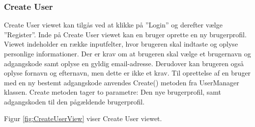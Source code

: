 \subsubsection{Create User}

Create User viewet kan tilgås ved at klikke på ''Login'' og derefter vælge ''Register''. Inde på Create User viewet kan en bruger oprette en ny brugerprofil. Viewet indeholder en række inputfelter, hvor brugeren skal indtaste og oplyse personlige informationer. Der er krav om at brugeren skal vælge et brugernavn og adgangskode samt oplyse en gyldig email-adresse. Derudover kan brugeren også oplyse fornavn og efternavn, men dette er ikke et krav. 
Til oprettelse af en bruger med en ny bestemt adgangskode anvendes Create() metoden fra UserManager klassen. Create metoden tager to parametre: Den nye brugerprofil, samt adgangskoden til den pågældende brugerprofil. 

Figur \ref{fig:CreateUserView} viser Create User viewet. 

